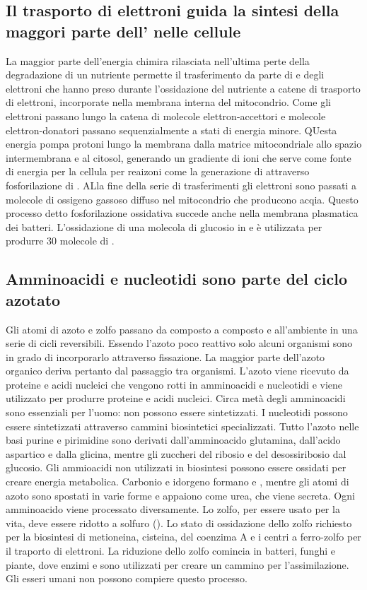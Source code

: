 \subsection{Il trasporto di elettroni guida la sintesi della maggori parte dell' nelle cellule}
La maggior parte dell'energia chimira rilasciata nell'ultima perte della degradazione di un nutriente permette il trasferimento da parte di  e  degli elettroni che
hanno preso durante l'ossidazione del nutriente a catene di trasporto di elettroni, incorporate nella membrana interna del mitocondrio. Come gli elettroni passano lungo la catena di
molecole elettron-accettori e molecole elettron-donatori passano sequenzialmente a stati di energia minore. QUesta energia pompa protoni  lungo la membrana dalla matrice 
mitocondriale allo spazio intermembrana e al citosol, generando un gradiente di ioni  che serve come fonte di energia per la cellula per reaizoni come la generazione di 
attraverso fosforilazione di . ALla fine della serie di trasferimenti gli elettroni sono passati a molecole di ossigeno gassoso diffuso nel mitocondrio che producono acqia. 
Questo processo detto fosforilazione ossidativa succede anche nella membrana plasmatica dei batteri. L'ossidazione di una molecola di glucosio in  e  \`e utilizzata per
produrre $30$ molecole di .
\subsection{Amminoacidi e nucleotidi sono parte del ciclo azotato}
Gli atomi di azoto e zolfo passano da composto a composto e all'ambiente in una serie di cicli reversibili. Essendo l'azoto poco reattivo solo alcuni organismi sono in grado di 
incorporarlo attraverso fissazione. La maggior parte dell'azoto organico deriva pertanto dal passaggio tra organismi. L'azoto viene ricevuto da proteine e acidi nucleici che vengono
rotti in amminoacidi e nucleotidi e viene utilizzato per produrre proteine e acidi nucleici. Circa met\`a degli amminoacidi sono essenziali per l'uomo: non possono essere sintetizzati. 
I nucleotidi possono essere sintetizzati attraverso cammini biosintetici specializzati. Tutto l'azoto nelle basi purine e pirimidine sono derivati dall'amminoacido glutamina, dall'acido
aspartico e dalla glicina, mentre gli zuccheri del ribosio e del desossiribosio dal glucosio. Gli ammioacidi non utilizzati in biosintesi possono essere ossidati per creare energia
metabolica. Carbonio e idorgeno formano  e , mentre gli atomi di azoto sono spostati in varie forme e appaiono come urea, che viene secreta. Ogni amminoacido viene
processato diversamente. Lo zolfo, per essere usato per la vita, deve essere ridotto a solfuro (). Lo stato di ossidazione dello zolfo richiesto per la biosintesi di 
metioneina, cisteina, del coenzima A e i centri a ferro-zolfo per il traporto di elettroni. La riduzione dello zolfo comincia in batteri, funghi e piante, dove enzimi e  sono 
utilizzati per creare un cammino per l'assimilazione. Gli esseri umani non possono compiere questo processo.
